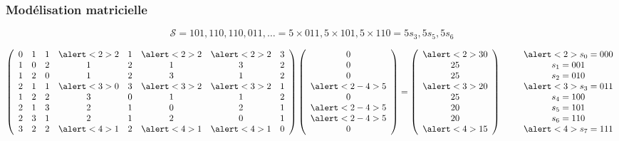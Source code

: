 \documentclass[table]{beamer}
\newcommand{\+}{\cellcolor[gray]{1}\bfseries}
\newcommand{\<}{\cellcolor[gray]{0.8}\rmfamily\itshape}
\def\S{\mathcal{S}}
\begin{document}
\begin{frame}
  \frametitle{Modélisation matricielle}

  \begin{displaymath}
    \S = 101, 110, 110, 011, \ldots = 5 \times 011, 5 \times
    101, 5 \times 110 = 5s_3, 5s_5, 5s_6
  \end{displaymath}

  \begin{displaymath}
    \left(
      \begin{array}{cccccccc}
        0 & 1 & 1 &\alert<2>{2}& 1 &\alert<2>{2}&\alert<2>{2}& 3\\
        1 & 0 & 2 & 1 & 2 & 1 & 3 & 2\\
        1 & 2 & 0 & 1 & 2 & 3 & 1 & 2\\
        2 & 1 & 1 &\alert<3>{0}& 3 &\alert<3>{2}&\alert<3>{2}& 1\\
        1 & 2 & 2 & 3 & 0 & 1 & 1 & 2\\
        2 & 1 & 3 & 2 & 1 & 0 & 2 & 1\\
        2 & 3 & 1 & 2 & 1 & 2 & 0 & 1\\
        3 & 2 & 2 &\alert<4>{1}& 2 &\alert<4>{1}&\alert<4>{1}& 0\\
      \end{array}
    \right)\left(
      \begin{array}{c}
        0\\
        0\\
        0\\
        \alert<2-4>{5}\\
        0\\
        \alert<2-4>{5}\\
        \alert<2-4>{5}\\
        0\\
      \end{array}
    \right) = \left(
      \begin{array}{c}
        \alert<2>{30}\\
        25\\
        25\\
        \alert<3>{20}\\
        25\\
        20\\
        20\\
        \alert<4>{15}\\
      \end{array}
    \right)
    \qquad
      \begin{array}{c}
        \alert<2>{s_0 = 000}\\
        s_1 = 001\\
        s_2 = 010\\
        \alert<3>{s_3 = 011}\\
        s_4 = 100\\
        s_5 = 101\\
        s_6 = 110\\
        \alert<4>{s_7 = 111}\\
      \end{array}
  \end{displaymath}\pause[5]


\end{frame}
\end{document}
